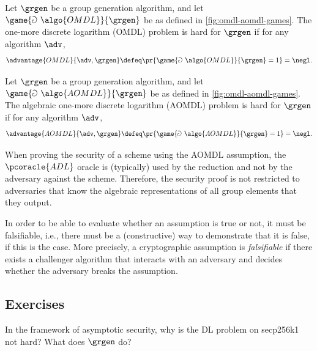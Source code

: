 \begin{definition}
  Let $\grgen$ be a group generation algorithm, and let $\game{\Game~\algo{OMDL}}{\grgen}$ be as defined in \autoref{fig:omdl-aomdl-games}.
  The one-more discrete logarithm (OMDL) problem is hard for $\grgen$ if for any \ppt algorithm $\adv$,
  \[
  \advantage{OMDL}{\adv, \grgen} \defeq \pr{\game{\Game~\algo{OMDL}}{\grgen} = 1} = \negl.
  \]
\end{definition}

\begin{definition}
  Let $\grgen$ be a group generation algorithm, and let $\game{\Game~\algo{AOMDL}}{\grgen}$ be as defined in \autoref{fig:omdl-aomdl-games}.
  The algebraic one-more discrete logarithm (AOMDL) problem is hard for $\grgen$ if for any \ppt algorithm $\adv$,
  \[
  \advantage{AOMDL}{\adv, \grgen} \defeq \pr{\game{\Game~\algo{AOMDL}}{\grgen} = 1} = \negl.
  \]
\end{definition}

\begin{remark}
  When proving the security of a scheme using the AOMDL assumption, the $\pcoracle{ADL}$ oracle is (typically) used by the reduction and not by the adversary against the scheme.
  Therefore, the security proof is not restricted to adversaries that know the algebraic representations of all group elements that they output.
\end{remark}

\begin{remark}
  In order to be able to evaluate whether an assumption is true or not, it must be falsifiable, i.e., there must be a (constructive) way to demonstrate that it is false, if this is the case.
  More precisely, a cryptographic assumption is \emph{falsifiable} if there exists a \ppt challenger algorithm that interacts with an adversary and decides whether the adversary breaks the assumption.
\end{remark}

\subsection{Exercises}

\begin{exercise}
  In the framework of asymptotic security, why is the DL problem on secp256k1 not hard? What does $\grgen$ do?
\end{exercise}

